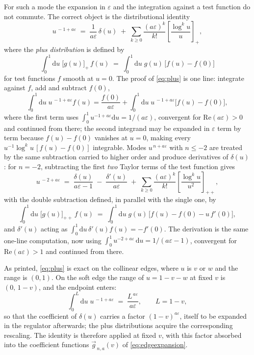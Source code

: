 \documentclass[11pt]{article}
\newcommand{\eps}{\varepsilon}
\newcommand{\dd}{\mathrm{d}}
\begin{document}
For such a mode the expansion in $\eps$ and the integration against a
test function do not commute.  The correct object is the
distributional identity
\begin{equation}
  u^{\,-1+a\eps} \;=\;
  \frac{1}{a\eps}\,\delta(u)
  \;+\;
  \sum_{k\ge0} \frac{(a\eps)^k}{k!}
  \left[\frac{\log^k u}{u}\right]_+ ,
  \label{eq:plus}
\end{equation}
where the \emph{plus distribution} is defined by
\begin{equation}
  \int_0^1 \dd u\; \big[g(u)\big]_+\, f(u)
  \;=\; \int_0^1 \dd u\; g(u)\,\big[f(u) - f(0)\big]
\end{equation}
for test functions $f$ smooth at $u = 0$.  The proof of
\eqref{eq:plus} is one line: integrate against $f$, add and
subtract $f(0)$,
\begin{equation}
  \int_0^1 \dd u\;u^{\,-1+a\eps} f(u)
  = \frac{f(0)}{a\eps}
  + \int_0^1 \dd u\;u^{\,-1+a\eps}\big[f(u) - f(0)\big] ,
\end{equation}
where the first term uses $\int_0^1 u^{-1+a\eps}\dd u =
1/(a\eps)$, convergent for $\mathrm{Re}(a\eps) > 0$ and continued
from there; the second integrand may be expanded in $\eps$ term by
term because $f(u) - f(0)$ vanishes at $u = 0$, making every
$u^{-1}\log^k u\,[f(u)-f(0)]$ integrable.  Modes $u^{\,n+a\eps}$ with
$n \le -2$ are treated by the same subtraction carried to higher
order and produce derivatives of $\delta(u)$: for $n = -2$,
subtracting the first \emph{two} Taylor terms of the test function
gives
\begin{equation}
  u^{\,-2+a\eps} \;=\;
  \frac{\delta(u)}{a\eps-1}
  \;-\; \frac{\delta'(u)}{a\eps}
  \;+\; \sum_{k\ge0} \frac{(a\eps)^k}{k!}
  \left[\frac{\log^k u}{u^{2}}\right]_{++} ,
\end{equation}
with the double subtraction defined, in parallel with the single
one, by
\begin{equation}
  \int_0^1 \dd u\; \big[g(u)\big]_{++}\, f(u)
  \;=\; \int_0^1 \dd u\; g(u)\,
  \big[f(u) - f(0) - u\,f'(0)\big] ,
\end{equation}
and $\delta'(u)$ acting as
$\int_0^1 \dd u\,\delta'(u) f(u) = -f'(0)$.  The derivation is the
same one-line computation, now using
$\int_0^1 u^{-2+a\eps}\,\dd u = 1/(a\eps-1)$, convergent for
$\mathrm{Re}(a\eps) > 1$ and continued from there.

As printed, \eqref{eq:plus} is exact on the collinear edges, where $u$
is $v$ or $w$ and the range is $(0,1)$.  On the soft edge the range of
$u = 1-v-w$ at fixed $v$ is $(0,\,1-v)$, and the endpoint enters:
\begin{equation}
  \int_0^{L} \dd u\; u^{\,-1+a\eps}
  \;=\; \frac{L^{\,a\eps}}{a\eps} ,
  \qquad L = 1-v ,
\end{equation}
so that the coefficient of $\delta(u)$ carries a factor
$(1-v)^{a\eps}$, itself to be expanded in the regulator afterwards;
the plus distributions acquire the corresponding rescaling.  The
identity is therefore applied at fixed $v$, with this factor absorbed
into the coefficient functions $\vec g_{\,n,a}(v)$ of
\eqref{eq:edgeexpansion}.
\end{document}
